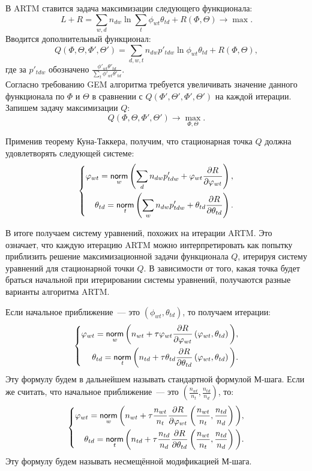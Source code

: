 \documentclass[12pt, twoside]{article}
\begin{document}
В ARTM ставится задача максимизации следующего функционала:
\[
L + R = \sum_{w,d} n_{dw} \ln\sum_t \phi_{wt} \theta_{td} +  R(\Phi, \Theta) \to \max.
\]
Вводится дополнительный функционал:
\[
	Q(\Phi, \Theta, \Phi', \Theta') = \sum\limits_{d, w, t} n_{dw} p'_{tdw} \ln{\phi_{wt}\theta_{td}} + R(\Phi, \Theta),
\]
где за $p'_{tdw}$ обозначено $\frac{\phi'_{wt} \theta'_{td}}{\sum\limits_t \phi'_{wt} \theta'_{td}}$.\\

Согласно требованию GEM алгоритма требуется увеличивать значение данного функционала по $\Phi$ и $\Theta$ в сравнении с $Q(\Phi', \Theta', \Phi', \Theta')$ на каждой итерации. Запишем задачу максимизации $Q$:
\[
Q(\Phi, \Theta, \Phi', \Theta') \to \max_{\Phi, \Theta}.
\]

Применив теорему Куна-Таккера,  получим, что стационарная точка $Q$ должна удовлетворять следующей системе:
\[
\left\{
	\begin{aligned}
		\varphi_{wt}= \mathop{\mathsf{norm}}\limits_w \left( \sum\limits_d n_{dw} p'_{tdw} + \varphi_{wt} \frac{\partial{R}}{\partial{\varphi_{wt}}} \right),\\
		\theta_{td} = \mathop{\mathsf{norm}}\limits_t \left( \sum\limits_w n_{dw} p'_{tdw} + \theta_{td} \frac{\partial{R}}{\partial{\theta_{td}}} \right).
	\end{aligned}
\right.
\]

В итоге получаем систему уравнений, похожих на итерации ARTM. Это означает, что каждую итерацию ARTM можно интерпретировать как попытку приблизить решение максимизационной задачи функционала $Q$, итерируя систему уравнений для стационарной точки $Q$. В зависимости от того, какая точка будет браться начальной при итерировании системы уравнений, получаются разные варианты алгоритма ARTM.

Если начальное приближение~--- это $(\phi_{wt}, \theta_{td})$, то получаем итерации:
\begin{equation}
\label{artm_original}
\left\{
	\begin{aligned}
		\phi_{wt} = \norm_w \bigg( n_{wt} + \tau\phi_{wt} \frac{\partial{R}}{\partial{\phi_{wt}}} \left( \phi_{wt}, \theta_{td}\right) \bigg),\\
		\theta_{td} = \norm_t \bigg( n_{td} + \tau\theta_{td} \frac{\partial{R}}{\partial{\theta_{td}}} \left( \phi_{wt}, \theta_{td}\right) \bigg).
	\end{aligned}
\right.
\end{equation}
Эту формулу будем в дальнейшем называть стандартной формулой М-шага. Если же считать, что начальное приближение~---  это $\left(\frac{n_{wt}}{n_t}, \frac{n_{td}}{n_d}\right)$, то:
\begin{equation}
\label{artm_unbiased}
\left\{
	\begin{aligned}
		\phi_{wt}= \norm_w \bigg( n_{wt} + \tau \frac{n_{wt}}{n_t} \frac{\partial{R}}{\partial{\phi_{wt}}} \left(\frac{n_{wt}}{n_t}, \frac{n_{td}}{n_d}\right) \bigg),\\
		\theta_{td} = \norm_t \bigg(n_{td} + \tau \frac{n_{td}}{n_d} \frac{\partial{R}}{\partial{\theta_{td}}} \left(\frac{n_{wt}}{n_t}, \frac{n_{td}}{n_d}\right) \bigg).
	\end{aligned}
\right.
\end{equation}
Эту формулу будем называть несмещённой модификацией М-шага.
\end{document}
